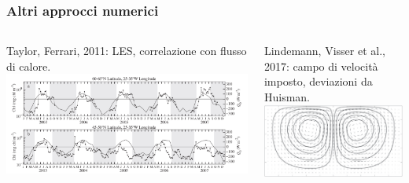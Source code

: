 \begin{frame}
  \frametitle{Altri approcci numerici}
  \begin{columns}

    Taylor, Ferrari, 2011: LES, correlazione con flusso di calore.
    \includegraphics[width=\textwidth]{../img/Taylor2011}

    Lindemann, Visser et al., 2017: campo di velocità imposto, deviazioni da Huisman.
    \\
    \includegraphics[width=\textwidth]{../img/Lindemann_flux}

  \end{columns}
\end{frame}


